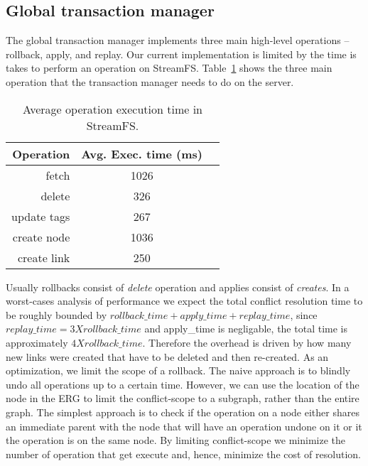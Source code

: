 

\subsection{Global transaction manager}
The global transaction manager implements three main high-level operations -- rollback, apply, and replay.  Our current implementation
is limited by the time is takes to perform an operation on StreamFS.  Table~\ref{tab:optimes} shows the three 
main operation that the transaction manager needs to do on the server.

\begin{table}
\begin{center}
  \begin{tabular}{| r | c  c | }
    \hline
    {\bf Operation } & {\bf Avg. Exec. time (ms) } &\\ \hline
    fetch & 1026 &\\ \hline
    delete & 326  &\\ \hline
    update tags & 267  &\\ \hline
    create node & 1036  &\\ \hline
    create link & 250  &\\ 
    \hline
  \end{tabular}
\caption{Average operation execution time in StreamFS.}
\label{tab:optimes}
\end{center}
\end{table}

Usually rollbacks consist of \emph{delete} operation and applies consist of \emph{creates}.  In a worst-cases analysis
of performance we expect the total conflict resolution time to be roughly bounded by
$rollback\_time + apply\_time + replay\_time$, since $replay\_time=3 X rollback\_time$ and apply\_time is negligable, 
the total time is approximately $4 X rollback\_time$.  Therefore the overhead is driven by how many new links were created
that have to be deleted and then re-created.  As an optimization, we limit the scope of a rollback.  The naive
approach is to blindly undo all operations up to a certain time.  However, we can use the location of the node
in the ERG to limit the conflict-scope to a subgraph, rather than the entire graph.  The simplest approach is to check if the operation
on a node either shares an immediate parent with the node that will have an operation undone on it or it the operation
is on the same node.  By limiting conflict-scope we minimize the number of operation that get execute and, hence, minimize the 
cost of resolution.


